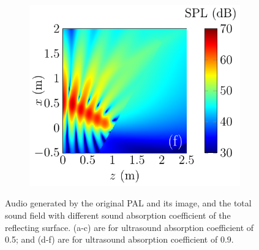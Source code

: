 \begin{figure}[!htb]
\begin{subfigure}{0.32\textwidth}
    \end{subfigure}
    \begin{subfigure}{0.32\textwidth}
        \centering
        \includegraphics[width = \textwidth]{fig/ComputePalReflectionTruncated_Ultra60000_LocSurface1m_Absorp90_Total_211013Y.pdf}
    \end{subfigure}
    \caption{Audio  generated by the original PAL and its image, and the total sound field with different sound absorption coefficient of the reflecting surface. (a-c) are for ultrasound absorption coefficient of 0.5; and (d-f) are for ultrasound absorption coefficient of 0.9.}
    \label{fig:reflection:vary_sound_absorp_coef}
\end{figure}

